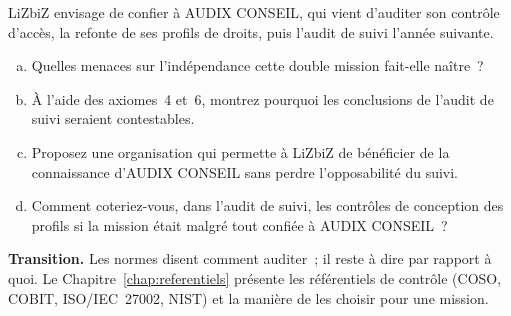 \begin{boxexo}[title={\ding{45}\quad Exercice~10.3. L'indépendance à l'épreuve \niveauexpert}]
LiZbiZ envisage de confier à AUDIX CONSEIL, qui vient d'auditer son
contrôle d'accès, la refonte de ses profils de droits, puis l'audit de
suivi l'année suivante.
\begin{enumerate}[(a)]
    \item Quelles menaces sur l'indépendance cette double mission
          fait-elle naître~?
    \item À l'aide des axiomes~4 et~6, montrez pourquoi les conclusions de
          l'audit de suivi seraient contestables.
    \item Proposez une organisation qui permette à LiZbiZ de bénéficier de
          la connaissance d'AUDIX CONSEIL sans perdre l'opposabilité du
          suivi.
    \item Comment coteriez-vous, dans l'audit de suivi, les contrôles de
          conception des profils si la mission était malgré tout confiée à
          AUDIX CONSEIL~?
\end{enumerate}
\end{boxexo}

\bigskip

\begin{boxinfo}
\textbf{Transition.} Les normes disent comment auditer~; il reste à dire
par rapport à quoi. Le Chapitre~\ref{chap:referentiels} présente les
référentiels de contrôle (COSO, COBIT, ISO/IEC~27002, NIST) et la manière
de les choisir pour une mission.
\end{boxinfo}
